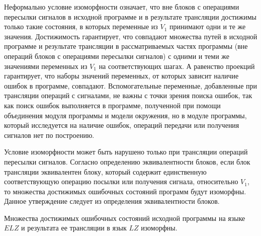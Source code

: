Неформально условие изоморфности означает, что вне блоков с операциями пересылки сигналов в исходной программе и в результате трансляции достижимы только такие состояния, в которых переменные из $V_1$ принимают одни и те же значения.
Достижимость гарантирует, что совпадают множества путей в исходной программе и результате трансляции в рассматриваемых частях программы (вне операций блоков с операциями пересылки сигналов) с одними и теми же значениями переменных из $V_1$ на соответствующих шагах.
А равенство проекций гарантирует, что наборы значений переменных, от которых зависит наличие ошибок в программе, совпадают.
Вспомогательные переменные, добавленные при трансляции операций с сигналами, не важны с точки зрения поиска ошибок, так как поиск ошибок выполняется в программе, полученной при помощи объединения модуля программы и модели окружения, но в модуле программы, который исследуется на наличие ошибок, операций передачи или получения сигналов нет по построению.

Условие изоморфности может быть нарушено только при трансляции операций пересылки сигналов.
Согласно определению эквивалентности блоков, если блок трансляции эквивалентен блоку, который содержит единственную соответствующую операцию посылки или получения сигнала, относительно $V_1$, то множества достижимых ошибочных состояний программ будут изоморфны. 
Данное утверждение следует из определения эквивалентности блоков.

\begin{theorem}
\label{theorem:iso}
Множества достижимых ошибочных состояний исходной программы на языке $ELZ$ и результата ее трансляции в язык $LZ$ изоморфны.
\end{theorem}

